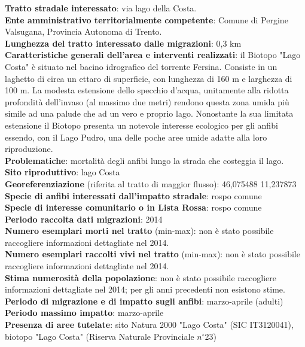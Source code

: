 \documentclass[11pt,a4paper,twoside]{memoir}
\begin{document}
\textbf{Tratto stradale interessato}: via lago della Costa. \\
\textbf{Ente amministrativo territorialmente competente}: Comune di Pergine Valsugana, Provincia Autonoma di Trento. \\
\textbf{Lunghezza del tratto interessato dalle migrazioni}: 0,3 km \\
\textbf{Caratteristiche generali dell’area e interventi realizzati}: il Biotopo "Lago Costa" è situato nel bacino idrografico del torrente Fersina. Consiste in un laghetto di circa un ettaro di superficie, con lunghezza di 160 m e larghezza di 100 m. La modesta estensione dello specchio d'acqua, unitamente alla ridotta profondità dell'invaso (al massimo due metri) rendono questa zona umida più simile ad una palude che ad un vero e proprio lago. Nonostante la sua limitata estensione il Biotopo presenta un notevole interesse ecologico per gli anfibi essendo, con il Lago Pudro, una delle poche aree umide adatte alla loro riproduzione. \\
\textbf{Problematiche}: mortalità degli anfibi lungo la strada che costeggia il lago. \\
\textbf{Sito riproduttivo}: lago Costa \\
\textbf{Georeferenziazione} (riferita al tratto di maggior flusso): 46,075488 11,237873 \\
\textbf{Specie di anfibi interessati dall’impatto stradale}: rospo comune \\
\textbf{Specie di interesse comunitario o in Lista Rossa}: rospo comune \\
\textbf{Periodo raccolta dati migrazioni}: 2014 \\
\textbf{Numero esemplari morti nel tratto} (min-max): non è stato possibile raccogliere informazioni dettagliate nel 2014.  \\
\textbf{Numero esemplari raccolti vivi nel tratto} (min-max): non è stato possibile raccogliere informazioni dettagliate nel 2014.   \\
\textbf{Stima numerosità della popolazione}: non è stato possibile raccogliere informazioni dettagliate nel 2014; per gli anni precedenti non esistono stime. \\
\textbf{Periodo di migrazione e di impatto sugli anfibi}: marzo-aprile (adulti) \\
\textbf{Periodo massimo impatto}: marzo-aprile \\
\textbf{Presenza di aree tutelate}: sito Natura 2000 "Lago Costa" (SIC IT3120041), biotopo "Lago Costa" (Riserva Naturale Provinciale $n^{\circ}$23) \\
\end{document}
